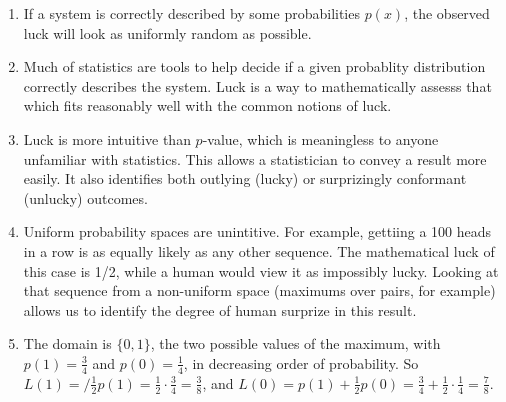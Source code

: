 \begin{enumerate}
  \item If a system is correctly described by some probabilities $p(x)$, the observed luck will look as uniformly random as possible.
  \item Much of statistics are tools to help decide if a given probablity distribution correctly describes the system.  Luck is a way to mathematically assesss that which fits reasonably well with the common notions of luck.
  \item Luck is more intuitive than $p$-value, which is meaningless to anyone unfamiliar with statistics. This allows a statistician to convey a result more easily.  It also identifies both outlying (lucky) or surprizingly conformant (unlucky) outcomes.
  \item Uniform probability spaces are unintitive.  For example, gettiing a 100 heads in a row is as equally likely as any other sequence.  The mathematical luck of this case is 1/2, while a human would view it as impossibly lucky.  Looking at that sequence from a non-uniform space (maximums over pairs, for example) allows us to identify the degree of human surprize in this result.
\item
The domain is $\{0,1\}$, the two possible values of the maximum, with $p(1)=\frac{3}{4}$ and $p(0)=\frac{1}{4}$, in decreasing order of probability.  So $L(1)=/\frac{1}{2} p(1) = \frac{1}{2} \cdot \frac{3}{4} = \frac{3}{8}$, and $L(0)=p(1)+\frac{1}{2} p(0) = \frac{3}{4} + \frac{1}{2} \cdot \frac{1}{4} = \frac{7}{8}$.


\end{enumerate}
